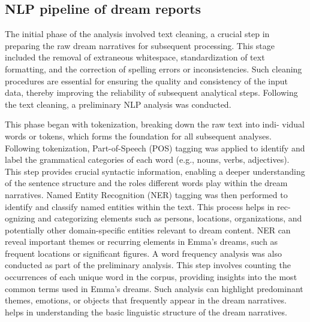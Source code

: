 \subsection{NLP pipeline of dream reports}

The initial phase of the analysis involved text cleaning, a crucial step in preparing the raw dream narratives for subsequent processing. This stage included the removal of extraneous whitespace, standardization of text formatting, and the correction of spelling errors or inconsistencies. Such cleaning procedures are essential for ensuring the quality and consistency of the input data, thereby improving the reliability of subsequent analytical steps. Following the text cleaning, a preliminary NLP analysis was conducted.

This phase began with tokenization, breaking down the raw text into indi- vidual words or tokens, which forms the foundation for all subsequent analyses. Following tokenization, Part-of-Speech (POS) tagging was applied to identify and label the grammatical categories of each word (e.g., nouns, verbs, adjectives). This step provides crucial syntactic information, enabling a deeper understanding of the sentence structure and the roles different words play within the dream narratives. Named Entity Recognition (NER) tagging was then performed to identify and classify named entities within the text. This process helps in rec- ognizing and categorizing elements such as persons, locations, organizations, and potentially other domain-specific entities relevant to dream content. NER can reveal important themes or recurring elements in Emma's dreams, such as frequent locations or significant figures. A word frequency analysis was also conducted as part of the preliminary analysis. This step involves counting the occurrences of each unique word in the corpus, providing insights into the most common terms used in Emma's dreams. Such analysis can highlight predominant themes, emotions, or objects that frequently appear in the dream narratives. helps in understanding the basic linguistic structure of the dream narratives.


